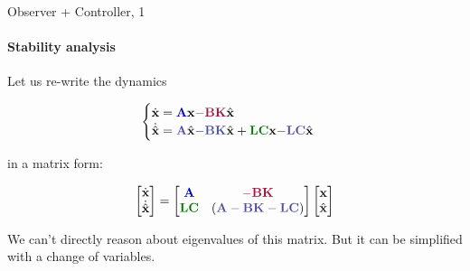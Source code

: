 \documentclass{beamer}
\begin{document}
\begin{frame}{Observer + Controller, 1}
\framesubtitle{Stability analysis}
\begin{flushleft}

Let us re-write the dynamics

\begin{equation}
\begin{cases}
\dot {\bo{x}} = \textcolor{mydarkblue}{\bo{A}} \bo{x} \textcolor{mydarkpink}{- \bo{B} \bo{K}} \hat{\bo{x}} 
\\
\dot{\hat{\bo{x}}} = \textcolor{mydarkgray}{\bo{A}} \hat{\bo{x}} \textcolor{mydarkgray}{- \bo{B} \bo{K}} \hat{\bo{x}} + \textcolor{mydarkgreen}{\bo{L}\bo{C}} \bo{x} \textcolor{mydarkgray}{- \bo{L}\bo{C}} \hat{\bo{x}}
\end{cases}
\end{equation}

in a matrix form:

\begin{equation}
\begin{bmatrix}
\dot {\bo{x}} \\
\dot{\hat{\bo{x}}} 
\end{bmatrix}
=
\begin{bmatrix}
\textcolor{mydarkblue}{\bo{A}} & \textcolor{mydarkpink}{-\bo{B}\bo{K}}\\
\textcolor{mydarkgreen}{\bo{L}\bo{C}} & (\textcolor{mydarkgray}{\bo{A} - \bo{B}\bo{K}-\bo{L}\bo{C}})
\end{bmatrix}
\begin{bmatrix}
\bo{x} \\
\hat{\bo{x}}
\end{bmatrix}
\end{equation}

\bigskip

We can't directly reason about eigenvalues of this matrix. But it can be simplified with a change of variables.

\end{flushleft}
\end{frame}
\end{document}

